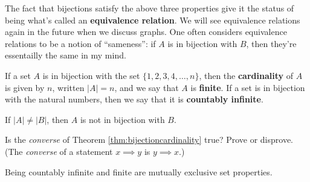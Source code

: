 \begin{remark} The fact that bijections satisfy the above three properties give it the status of being what's called an \textbf{equivalence relation}.  We will see equivalence relations again in the future when we discuss graphs.  One often considers equivalence relations to be a notion of ``sameness'': if $A$ is in bijection with $B$, then they're essentailly the same in my mind.
\end{remark}

\begin{definition} If a set $A$ is in bijection with the set $\{1, 2, 3, 4, \ldots, n\}$, then the \textbf{cardinality} of $A$ is given by $n$, written $|A| = n$, and we say that $A$ is \textbf{finite}.  If a set is in bijection with the natural numbers, then we say that it is \textbf{countably infinite}.\end{definition}

\begin{theorem} \label{thm:bijectioncardinality} If $|A|\neq |B|$, then $A$ is not in bijection with $B$. \end{theorem}

\begin{question} Is the \textit{converse} of Theorem \ref{thm:bijectioncardinality} true?  Prove or disprove. (The \textit{converse} of a statement $x \implies y$ is $y \implies x$.)
\end{question}

\begin{theorem} Being countably infinite and finite are mutually exclusive set properties. \end{theorem}




